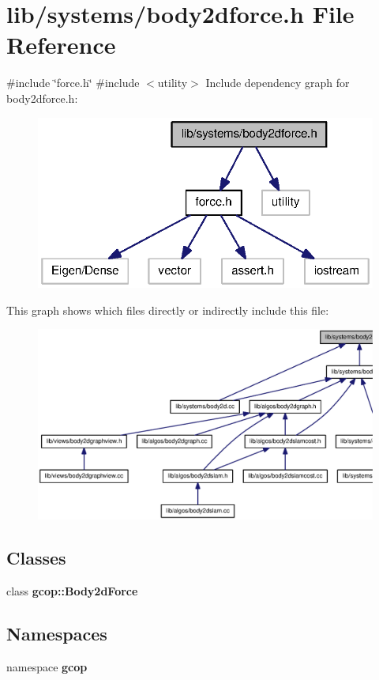 \section{lib/systems/body2dforce.h \-File \-Reference}
\label{body2dforce_8h}
{\ttfamily \#include \char`\"{}force.\-h\char`\"{}}\*
{\ttfamily \#include $<$utility$>$}\*
\-Include dependency graph for body2dforce.\-h\-:\nopagebreak
\begin{figure}[H]
\begin{center}
\leavevmode
\includegraphics[width=320pt]{body2dforce_8h__incl}
\end{center}
\end{figure}
\-This graph shows which files directly or indirectly include this file\-:\nopagebreak
\begin{figure}[H]
\begin{center}
\leavevmode
\includegraphics[width=350pt]{body2dforce_8h__dep__incl}
\end{center}
\end{figure}
\subsection*{\-Classes}
\begin{DoxyCompactItemize}
\item 
class {\bf gcop\-::\-Body2d\-Force}
\end{DoxyCompactItemize}
\subsection*{\-Namespaces}
\begin{DoxyCompactItemize}
\item 
namespace {\bf gcop}
\end{DoxyCompactItemize}
